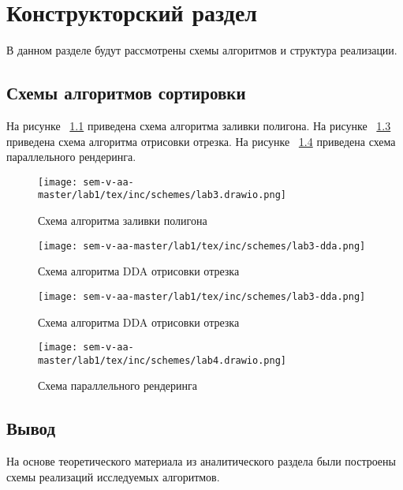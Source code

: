 \chapter{Конструкторский раздел}
\label{cha:design}

В данном разделе будут рассмотрены схемы алгоритмов и структура реализации.

\section{Схемы алгоритмов сортировки}
На рисунке ~\ref{fig:edge_flag} приведена схема алгоритма заливки полигона.
На рисунке ~\ref{fig:dda} приведена схема алгоритма отрисовки отрезка.
На рисунке ~\ref{fig:thread} приведена схема параллельного рендеринга.

\begin{figure}
    \centering
    \texttt{[image: sem-v-aa-master/lab1/tex/inc/schemes/lab3.drawio.png]}
    \caption{Схема алгоритма заливки полигона}
    \label{fig:edge_flag}
\end{figure}

\begin{figure}
    \centering
    \texttt{[image: sem-v-aa-master/lab1/tex/inc/schemes/lab3-dda.png]}
    \caption{Схема алгоритма DDA отрисовки отрезка}
    \label{fig:dda}
\end{figure}

\begin{figure}
    \centering
    \texttt{[image: sem-v-aa-master/lab1/tex/inc/schemes/lab3-dda.png]}
    \caption{Схема алгоритма DDA отрисовки отрезка}
    \label{fig:dda}
\end{figure}

\begin{figure}
    \centering
    \texttt{[image: sem-v-aa-master/lab1/tex/inc/schemes/lab4.drawio.png]}
    \caption{Схема параллельного рендеринга}
    \label{fig:thread}
\end{figure}
    
\section{Вывод}

На основе теоретического материала из аналитического раздела были построены схемы реализаций исследуемых алгоритмов.

